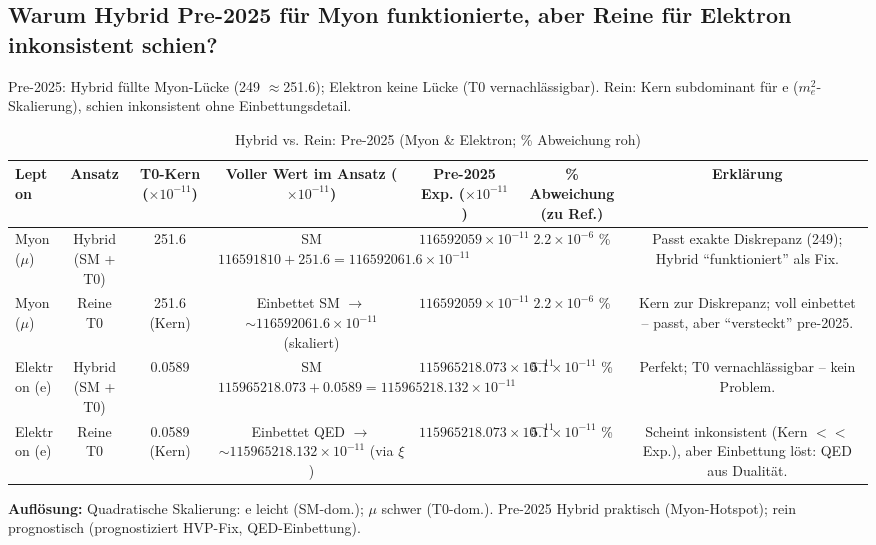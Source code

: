 \documentclass[12pt,a4paper]{article}
\begin{document}
	\subsection{Warum Hybrid Pre-2025 für Myon funktionierte, aber Reine für Elektron inkonsistent schien?}
	
	Pre-2025: Hybrid füllte Myon-Lücke (249 $\approx$251.6); Elektron keine Lücke (T0 vernachlässigbar). Rein: Kern subdominant für e ($m_e^2$-Skalierung), schien inkonsistent ohne Einbettungsdetail.
	
	\begin{table}[ht!]
		\centering
		\small
		\begin{adjustbox}{max width=\textwidth}
			\begin{tabular}{lcccccc}
				\toprule
				Lepton & Ansatz & T0-Kern ($ \times 10^{-11}$) & Voller Wert im Ansatz ($ \times 10^{-11}$) & Pre-2025 Exp. ($ \times 10^{-11}$) & \% Abweichung (zu Ref.) & Erklärung \\
				\midrule
				Myon ($\mu$) & Hybrid (SM + T0) & 251.6 & SM $116591810 + 251.6 = 116592061.6 \times 10^{-11}$ & $116592059 \times 10^{-11}$ & $2.2 \times 10^{-6}$ \% & Passt exakte Diskrepanz (249); Hybrid ``funktioniert'' als Fix. \\
				Myon ($\mu$) & Reine T0 & 251.6 (Kern) & Einbettet SM $\to$ $\sim 116592061.6 \times 10^{-11}$ (skaliert) & $116592059 \times 10^{-11}$ & $2.2 \times 10^{-6}$ \% & Kern zur Diskrepanz; voll einbettet -- passt, aber ``versteckt'' pre-2025. \\
				Elektron (e) & Hybrid (SM + T0) & 0.0589 & SM $115965218.073 + 0.0589 = 115965218.132 \times 10^{-11}$ & $115965218.073 \times 10^{-11}$ & $5.1 \times 10^{-11}$ \% & Perfekt; T0 vernachlässigbar -- kein Problem. \\
				Elektron (e) & Reine T0 & 0.0589 (Kern) & Einbettet QED $\to$ $\sim 115965218.132 \times 10^{-11}$ (via $\xi$) & $115965218.073 \times 10^{-11}$ & $5.1 \times 10^{-11}$ \% & Scheint inkonsistent (Kern $<<$ Exp.), aber Einbettung löst: QED aus Dualität. \\
				\bottomrule
			\end{tabular}
		\end{adjustbox}
		\caption{Hybrid vs. Rein: Pre-2025 (Myon \& Elektron; \% Abweichung roh)}
		\label{tab:hybrid_inconsistency}
	\end{table}
	
	\textbf{Auflösung:} Quadratische Skalierung: e leicht (SM-dom.); $\mu$ schwer (T0-dom.). Pre-2025 Hybrid praktisch (Myon-Hotspot); rein prognostisch (prognostiziert HVP-Fix, QED-Einbettung).
	
\end{document}
